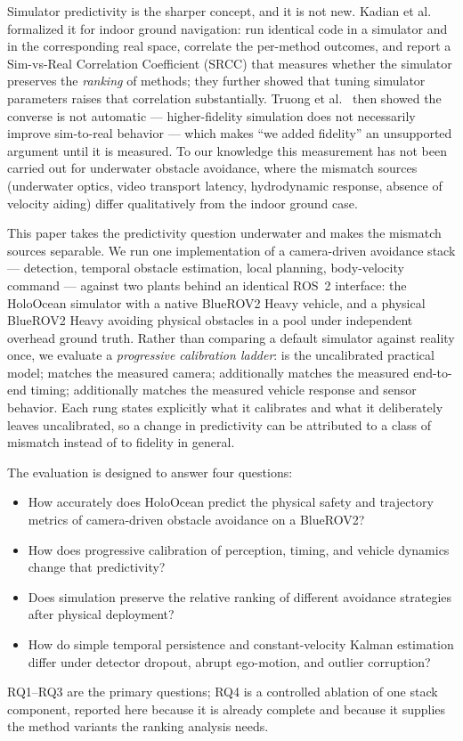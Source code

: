 Simulator predictivity is the sharper concept, and it is not new. Kadian et
al.~\cite{kadian2020simrealp} formalized it for indoor ground navigation:
run identical code in a simulator and in the corresponding real space,
correlate the per-method outcomes, and report a Sim-vs-Real Correlation
Coefficient (SRCC) that measures whether the simulator preserves the
\emph{ranking} of methods; they further showed that tuning simulator
parameters raises that correlation substantially. Truong et
al.~\cite{truong2022rethinki} then showed the converse is not automatic ---
higher-fidelity simulation does not necessarily improve sim-to-real behavior
--- which makes ``we added fidelity'' an unsupported argument until it is
measured. To our knowledge this measurement has not been carried out for
underwater obstacle avoidance, where the mismatch sources (underwater optics,
video transport latency, hydrodynamic response, absence of velocity aiding)
differ qualitatively from the indoor ground case.

This paper takes the predictivity question underwater and makes the mismatch
sources separable. We run one implementation of a camera-driven avoidance
stack --- detection, temporal obstacle estimation, local planning, body-velocity
command --- against two plants behind an identical ROS~2 interface: the
HoloOcean simulator with a native BlueROV2 Heavy vehicle, and a physical
BlueROV2 Heavy avoiding physical obstacles in a pool under independent
overhead ground truth. Rather than comparing a default simulator against
reality once, we evaluate a \emph{progressive calibration ladder}: \SZERO{}
is the uncalibrated practical model; \SONE{} matches the measured camera;
\STWO{} additionally matches the measured end-to-end timing; \STHREE{}
additionally matches the measured vehicle response and sensor behavior. Each
rung states explicitly what it calibrates and what it deliberately leaves
uncalibrated, so a change in predictivity can be attributed to a class of
mismatch instead of to fidelity in general.

The evaluation is designed to answer four questions:
\begin{itemize}
  \item[\textbf{RQ1}] How accurately does HoloOcean predict the physical
    safety and trajectory metrics of camera-driven obstacle avoidance on a
    BlueROV2?
  \item[\textbf{RQ2}] How does progressive calibration of perception, timing,
    and vehicle dynamics change that predictivity?
  \item[\textbf{RQ3}] Does simulation preserve the relative ranking of
    different avoidance strategies after physical deployment?
  \item[\textbf{RQ4}] How do simple temporal persistence and constant-velocity
    Kalman estimation differ under detector dropout, abrupt ego-motion, and
    outlier corruption?
\end{itemize}
RQ1--RQ3 are the primary questions; RQ4 is a controlled ablation of one stack
component, reported here because it is already complete and because it
supplies the method variants the ranking analysis needs.

